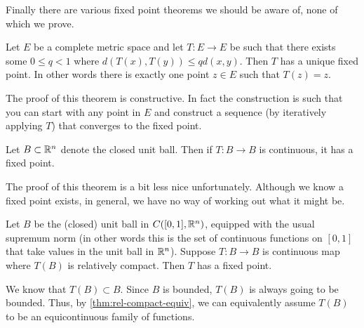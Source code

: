 Finally there are various fixed point theorems we should be aware of, none of which we prove.
\begin{theorem}\label{thm:banach-con-map}
    Let $E$ be a complete metric space and let $T: E \to E$ be such that there exists some $0 \leq q < 1$ where $d(T(x), T(y)) \leq qd(x, y)$. Then $T$ has a unique fixed point. In other words there is exactly one point $z \in E$ such that $T(z) = z$.
\end{theorem}
\begin{remark}
The proof of this theorem is constructive. In fact the construction is such that you can start with any point in $E$ and construct a sequence (by iteratively applying $T$) that converges to the fixed point.
\end{remark}
\begin{theorem}
    Let $B \subset \mathbb{R}^n$ denote the closed unit ball. Then if $T: B \to B$ is continuous, it has a fixed point.
\end{theorem}
\begin{remark}
The proof of this theorem is a bit less nice unfortunately. Although we know a fixed point exists, in general, we have no way of working out what it might be.
\end{remark}
\begin{theorem}\label{thm:sch-tyc-thm}
    Let $B$ be the (closed) unit ball in $C([0, 1], \mathbb{R}^n)$, equipped with the usual supremum norm (in other words this is the set of continuous functions on $[0, 1]$ that take values in the unit ball in $\mathbb{R}^n$). Suppose $T: B \to B$ is continuous map where $T(B)$ is relatively compact. Then $T$ has a fixed point. 
\end{theorem}
\begin{remark}
We know that $T(B) \subset B$. Since $B$ is bounded, $T(B)$ is always going to be bounded. Thus, by \autoref{thm:rel-compact-equiv}, we can equivalently assume $T(B)$ to be an equicontinuous family of functions.
\end{remark}